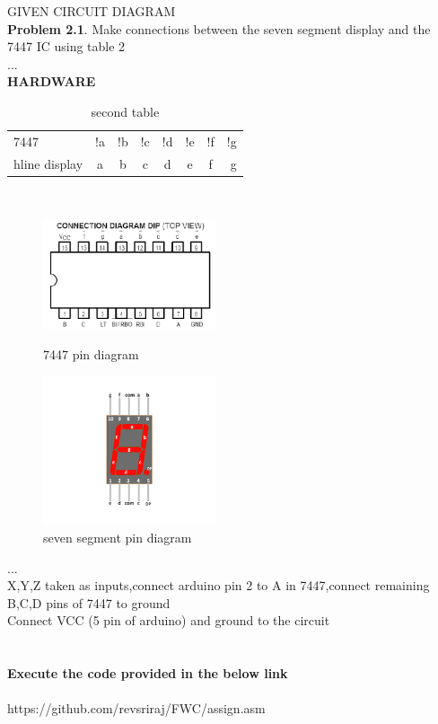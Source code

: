 \documentclass{article}
\begin{document}
GIVEN CIRCUIT DIAGRAM \\
\textbf{Problem 2.1}. Make connections between the seven
segment display  and the 7447 IC using table 2\\
...\\

\textbf{HARDWARE}\\
 \begin{table}[ht]
            \centering
            \begin{tabular}{|l|c|c|c|c|c|c|r|}
            \hline
            7447 & !a & !b & !c & !d & !e & !f & !g
            \\hline
            display & a & b & c & d & e & f & g\\
            \hline
            \end{tabular}
\caption{second table}
\label{tab:second table}
\end{table}\\
\begin{figure}[ht]
\centering
\begin{minipage}[b]{.49\textwidth}
    \includegraphics[width=2in]{7447.png}
    \caption{7447 pin diagram}
    \label{fig:7447 pin diagram}
     \end{minipage}
\begin{minipage}[b]{.49\textwidth}
\includegraphics[width=2in]{seven segment.png}
    \caption{seven segment pin diagram}
    \label{fig:seven segment pin diagram}
     \end{minipage}
\end{figure}
...\\
X,Y,Z taken as inputs,connect arduino pin 2 to A in 7447,connect remaining B,C,D pins of 7447 to ground\\
Connect VCC (5 pin of arduino) and ground to the circuit
\\
\\
\\
\textbf{Execute the code provided in the below link}
\\
\\
https://github.com/revsriraj/FWC/assign.asm
\end{document}
